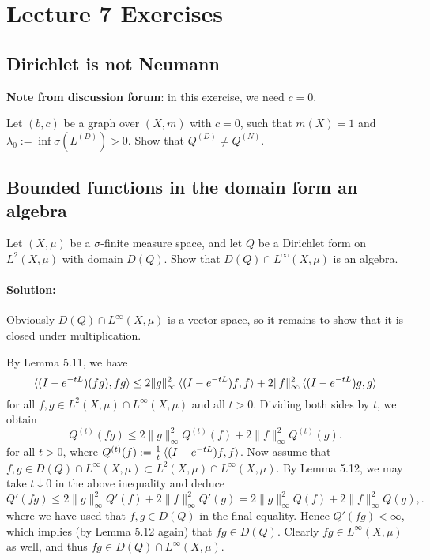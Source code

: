 \section{Lecture 7 Exercises}

\subsection{Dirichlet is not Neumann}

\textbf{Note from discussion forum}: in this exercise, we need $c=0$.

Let $(b, c)$ be a graph over $(X,m)$ with $c=0$, such that $m(X)=1$ and $\lambda_0 := \inf\sigma(L^{(D)})>0$. Show that $Q^{(D)}\ne Q^{(N)}$.

\subsection{Bounded functions in the domain form an algebra}
Let $(X,\mu)$ be a $\sigma$-finite measure space, and let $Q$ be a Dirichlet form on $L^2(X,\mu)$ with domain $D(Q)$. Show that $D(Q)\cap L^\infty(X,\mu)$ is an algebra.

\paragraph{Solution:}

Obviously $D(Q)\cap L^\infty(X,\mu)$ is a vector space, so it remains to show that it is closed under multiplication.

By Lemma 5.11, we have
\begin{equation*}
	\braket{(I-e^{-tL})(fg), fg} \le 2\|g\|^2_\infty \braket{(I-e^{-tL})f,f} + 2\|f\|^2_\infty \braket{(I-e^{-tL})g,g}
\end{equation*}
for all $f,g\in L^2(X,\mu)\cap L^\infty(X,\mu)$ and all $t>0$. Dividing both sides by $t$, we obtain
\begin{equation}
	Q^{(t)}(fg) \le 2\|g\|^2_\infty Q^{(t)}(f) + 2\|f\|^2_\infty Q^{(t)}(g).
\end{equation}
for all $t>0$, where $Q^{(t)}(f) := \frac{1}{t}\braket{(I-e^{-tL})f,f}$. Now assume that $f, g\in D(Q)\cap L^\infty(X,\mu) \subset L^2(X,\mu)\cap L^\infty(X,\mu)$. By Lemma 5.12, we may take $t\downarrow 0$ in the above inequality and deduce
\begin{equation*}
	Q'(fg) \le 2\|g\|^2_\infty Q'(f) + 2\|f\|^2_\infty Q'(g) = 2\|g\|^2_\infty Q(f) + 2\|f\|^2_\infty Q(g),.
\end{equation*}
where we have used that $f, g\in D(Q)$ in the final equality. Hence $Q'(fg)<\infty$, which implies (by Lemma 5.12 again) that $fg\in D(Q)$. Clearly $fg\in L^\infty(X,\mu)$ as well, and thus $fg \in D(Q)\cap L^\infty(X,\mu)$.